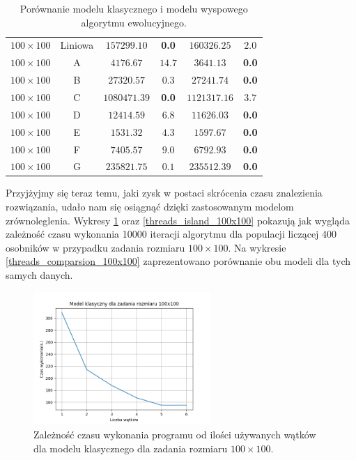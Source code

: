 \begin{table}[H]
\begin{center}
\begin{tabular}{c|c||c|c||c|c}
            \hline
            $100 \times 100$ & Liniowa   & $157299.10$ & \textbf{0.0}            & $160326.25$ & $2.0$ \\
            $100 \times 100$ & A         & $4176.67$ & $14.7$                    & $3641.13$ & \textbf{0.0} \\
            $100 \times 100$ & B         & $27320.57$ & $0.3$                    & $27241.74$ & \textbf{0.0} \\
            $100 \times 100$ & C         & $1080471.39$ & \textbf{0.0}           & $1121317.16$ & $3.7$ \\
            $100 \times 100$ & D         & $12414.59$ & $6.8$                    & $11626.03$ & \textbf{0.0} \\
            $100 \times 100$ & E         & $1531.32$ & $4.3$                     & $1597.67$ & \textbf{0.0} \\
            $100 \times 100$ & F         & $7405.57$ & $9.0$                     & $6792.93$ & \textbf{0.0} \\
            $100 \times 100$ & G         & $235821.75$ & $0.1$                   & $235512.39$ & \textbf{0.0} \\
        \end{tabular}
    \end{center}
    \caption{Porównanie modelu klasycznego i modelu wyspowego algorytmu ewolucyjnego.}
    \label{wyniki-4}
\end{table}

Przyjżyjmy się teraz temu, jaki zysk w postaci skrócenia czasu znalezienia rozwiązania, udało nam się osiągnąć dzięki zastosowanym modelom 
zrównoleglenia. Wykresy \ref{threads_regular_100x100} oraz \ref{threads_island_100x100} pokazują jak wygląda zależność czasu wykonania 10000 iteracji 
algorytmu dla populacji liczącej 400 osobników w przypadku zadania rozmiaru $100 \times 100$. Na wykresie \ref{threads_comparsion_100x100} 
zaprezentowano porównanie obu modeli dla tych samych danych. 

\begin{figure}[H]
    \centering        
    \includegraphics[width=0.6\textwidth]{img/plot_regular_threads_100x100.png}
    \caption{Zależność czasu wykonania programu od ilości używanych wątków dla modelu klasycznego dla zadania rozmiaru $100\times100$.}
    \label{threads_regular_100x100}
\end{figure}

